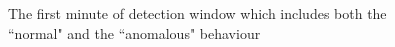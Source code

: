 
\begin{figure}[!h]
  \centering
      {}
   \caption{The first minute of detection window which includes both the ``normal" and the ``anomalous" behaviour}
  \label{fig:one_minute_timeseries}
\end{figure}

